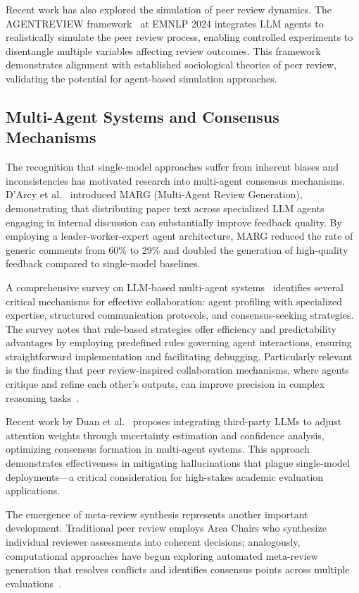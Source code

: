 Recent work has also explored the simulation of peer review dynamics. The AGENTREVIEW framework~\cite{jin2024agentreview} at EMNLP 2024 integrates LLM agents to realistically simulate the peer review process, enabling controlled experiments to disentangle multiple variables affecting review outcomes. This framework demonstrates alignment with established sociological theories of peer review, validating the potential for agent-based simulation approaches.

\subsection{Multi-Agent Systems and Consensus Mechanisms}

The recognition that single-model approaches suffer from inherent biases and inconsistencies has motivated research into multi-agent consensus mechanisms. D'Arcy et al.~\cite{darcy2024marg} introduced MARG (Multi-Agent Review Generation), demonstrating that distributing paper text across specialized LLM agents engaging in internal discussion can substantially improve feedback quality. By employing a leader-worker-expert agent architecture, MARG reduced the rate of generic comments from 60\% to 29\% and doubled the generation of high-quality feedback compared to single-model baselines.

A comprehensive survey on LLM-based multi-agent systems~\cite{guo2024survey} identifies several critical mechanisms for effective collaboration: agent profiling with specialized expertise, structured communication protocols, and consensus-seeking strategies. The survey notes that rule-based strategies offer efficiency and predictability advantages by employing predefined rules governing agent interactions, ensuring straightforward implementation and facilitating debugging. Particularly relevant is the finding that peer review-inspired collaboration mechanisms, where agents critique and refine each other's outputs, can improve precision in complex reasoning tasks~\cite{xu2023peer}.

Recent work by Duan et al.~\cite{duan2024consensus} proposes integrating third-party LLMs to adjust attention weights through uncertainty estimation and confidence analysis, optimizing consensus formation in multi-agent systems. This approach demonstrates effectiveness in mitigating hallucinations that plague single-model deployments—a critical consideration for high-stakes academic evaluation applications.

The emergence of meta-review synthesis represents another important development. Traditional peer review employs Area Chairs who synthesize individual reviewer assessments into coherent decisions; analogously, computational approaches have begun exploring automated meta-review generation that resolves conflicts and identifies consensus points across multiple evaluations~\cite{li2023meta}.

